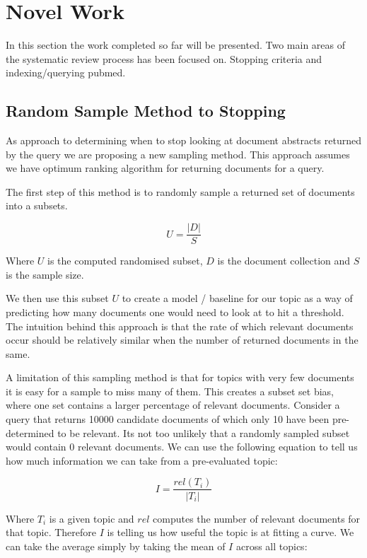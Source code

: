 \chapter{Novel Work}

In this section the work completed so far will be presented. Two main areas of the systematic review process has been focused on. Stopping criteria and indexing/querying pubmed.

\section{Random Sample Method to Stopping}

As approach to determining when to stop looking at document abstracts returned by the query we are proposing a new sampling method. This approach assumes we have optimum ranking algorithm for returning documents for a query.

The first step of this method is to randomly sample a returned set of documents into a subsets. 

\begin{equation}
U = \frac{|D|}{S}
\end{equation}

Where $U$ is the computed randomised subset, $D$ is the document collection and $S$ is the sample size.

We then use this subset $U$ to create a model / baseline for our topic as a way of predicting how many documents one would need to look at to hit a threshold. The intuition behind this approach is that the rate of which relevant documents occur should be relatively similar when the number of returned documents in the same.

A limitation of this sampling method is that for topics with very few documents it is easy for a sample to miss many of them. This creates a subset set bias, where one set contains a larger percentage of relevant documents. Consider a query that returns 10000 candidate documents of which only 10 have been pre-determined to be relevant. Its not too unlikely that a randomly sampled subset would contain 0 relevant documents. We can use the following equation to tell us how much information we can take from a pre-evaluated topic:

\begin{equation}
I = \frac{rel(T_i)}{|T_i|}
\end{equation}

Where $T_i$ is a given topic and $rel$ computes the number of relevant documents for that topic. Therefore $I$ is telling us how useful the topic is at fitting a curve. We can take the average simply by taking the mean of $I$ across all topics:


